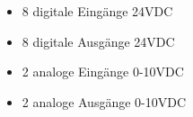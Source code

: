 
\begin{itemize}
    \item 8 digitale Eingänge 24VDC
    \item 8 digitale Ausgänge 24VDC
    \item 2 analoge Eingänge 0-10VDC
    \item 2 analoge Ausgänge 0-10VDC
\end{itemize}
